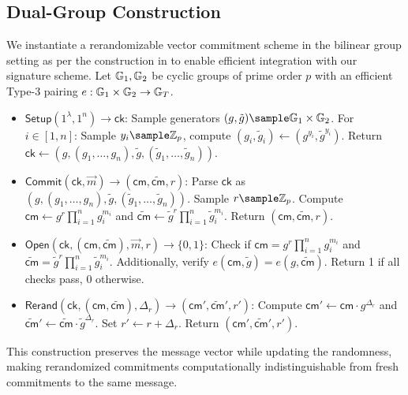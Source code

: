 \subsection{Dual-Group Construction}

We instantiate a rerandomizable vector commitment scheme in the bilinear group setting as per the construction in \cite{tomescu2022utt} to enable efficient integration with our signature scheme. Let $\mathbb{G}_1, \mathbb{G}_2$ be cyclic groups of prime order $p$ with an efficient Type-3 pairing $e: \mathbb{G}_1 \times \mathbb{G}_2 \to \mathbb{G}_T$.

\begin{itemize}
    \item $\mathsf{Setup}(1^\lambda, 1^n) \to \mathsf{ck}$:
    Sample generators $(g, \tilde{g}) \sample \G_1 \times \G_2$.
    For $i \in [1,n]$: Sample $y_i \sample \Z_p$, compute $(g_i, \tilde{g}_i) \gets (g^{y_i}, \tilde{g}^{y_i})$.
    Return $\mathsf{ck} \gets (g, (g_1,\ldots,g_n), \tilde{g}, (\tilde{g}_1,\ldots,\tilde{g}_n))$.
    
    \item $\mathsf{Commit}(\mathsf{ck}, \vec{m}) \to (\mathsf{cm}, \widetilde{\mathsf{cm}}, r)$:
    Parse $\mathsf{ck}$ as $(g, (g_1,\ldots,g_n), \tilde{g}, (\tilde{g}_1,\ldots,\tilde{g}_n))$.
    Sample $r \sample \Z_p$.
    Compute $\mathsf{cm} \gets g^r \prod_{i=1}^n g_i^{m_i}$ and $\widetilde{\mathsf{cm}} \gets \tilde{g}^r \prod_{i=1}^n \tilde{g}_i^{m_i}$.
    Return $(\mathsf{cm}, \widetilde{\mathsf{cm}}, r)$.
    
    \item $\mathsf{Open}(\mathsf{ck}, (\mathsf{cm}, \widetilde{\mathsf{cm}}), \vec{m}, r) \to \{0,1\}$:
    Check if $\mathsf{cm} = g^r \prod_{i=1}^n g_i^{m_i}$ and $\widetilde{\mathsf{cm}} = \tilde{g}^r \prod_{i=1}^n \tilde{g}_i^{m_i}$.
    Additionally, verify $e(\mathsf{cm}, \tilde{g}) = e(g, \widetilde{\mathsf{cm}})$.
    Return 1 if all checks pass, 0 otherwise.
    
    \item $\mathsf{Rerand}(\mathsf{ck}, (\mathsf{cm}, \widetilde{\mathsf{cm}}), \Delta_r) \to ({\mathsf{cm}}', \widetilde{\mathsf{cm}}', r')$:
    Compute ${\mathsf{cm}}' \gets \mathsf{cm} \cdot g^{\Delta_r}$ and $\widetilde{\mathsf{cm}}' \gets \widetilde{\mathsf{cm}} \cdot \tilde{g}^{\Delta_r}$.
    Set $r' \gets r + \Delta_r$.
    Return $({\mathsf{cm}}', \widetilde{\mathsf{cm}}', r')$.
\end{itemize}

This construction preserves the message vector while updating the randomness, making rerandomized commitments computationally indistinguishable from fresh commitments to the same message.


